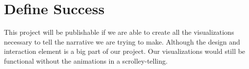 \documentclass{proc}
\begin{document}
\section{Define Success}
This project will be publishable if we are able to create all the visualizations necessary to tell the narrative we are trying to make. Although the design and interaction element is a big part of our project. Our visualizations would still be functional without the animations in a scrolley-telling. 



\end{document}
